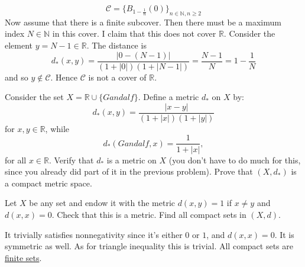 \begin{solution}
    \begin{equation}
      \mathscr{C} = \{B_{1 - \frac{1}{n}} (0)\}_{n \in \mathbb{N}, n \geq 2}
    \end{equation}
    Now assume that there is a finite subcover. Then there must be a maximum index $N \in \mathbb{N}$ in this cover. I claim that this does not cover $\mathbb{R}$. Consider the element $y = N - 1 \in \mathbb{R}$. The distance is 
    \begin{equation}
      d_\ast (x, y) = \frac{|0 - (N - 1)|}{(1 + |0|)(1 + |N-1|)} = \frac{N-1}{N} = 1 - \frac{1}{N}
    \end{equation} 
    and so $y \not\in \mathscr{C}$. Hence $\mathscr{C}$ is not a cover of $\mathbb{R}$. 
  \end{solution}

  \begin{exercise}
    Consider the set $X = \mathbb{R} \cup \{Gandalf\}$. Define a metric $d_{\ast}$ on $X$ by:
    \begin{equation}
      d_{\ast}(x,y) = \frac{|x-y|}{(1+|x|)(1+|y|)}
    \end{equation}
    for $x,y \in \mathbb{R}$, while
    \begin{equation}
      d_{\ast}(Gandalf,x) = \frac{1}{1+|x|},
    \end{equation}
    for all $x \in \mathbb{R}$. Verify that $d_{\ast}$ is a metric on $X$ (you don't have to do much
    for this, since you already did part of it in the previous problem). Prove
    that $(X,d_{\ast})$ is a compact metric space.
  \end{exercise}
  \begin{solution}
    
  \end{solution}

  \begin{exercise}
    Let $X$ be any set and endow it with the metric $d(x,y) = 1$ if $x \neq y$ and
    $d(x,x) = 0$. Check that this is a metric. Find all compact sets in $(X,d)$.
  \end{exercise}
  \begin{solution}
    It trivially satisfies nonnegativity since it's either $0$ or $1$, and $d(x, x) = 0$. It is symmetric as well. As for triangle inequality this is trivial. All compact sets are \hyperref[st-def:finite-set]{finite sets}. 
  \end{solution}

